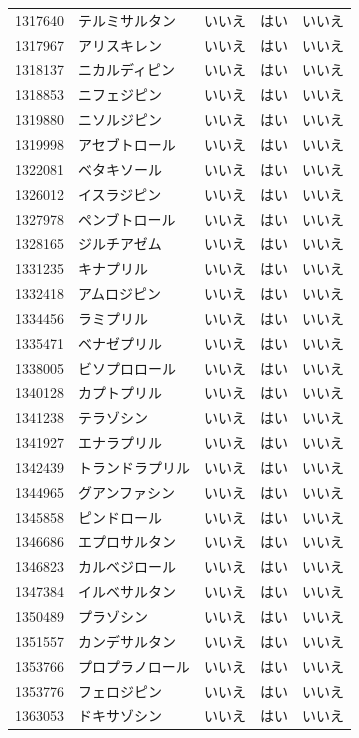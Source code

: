 \documentclass[
  11pt]{book}
\theoremstyle{definition}
\theoremstyle{definition}
\theoremstyle{definition}
\theoremstyle{definition}
\theoremstyle{remark}
\begin{document}
\begin{longtable}[]{@{}lllll@{}}
1317640 & テルミサルタン & いいえ & はい & いいえ \\
1317967 & アリスキレン & いいえ & はい & いいえ \\
1318137 & ニカルディピン & いいえ & はい & いいえ \\
1318853 & ニフェジピン & いいえ & はい & いいえ \\
1319880 & ニソルジピン & いいえ & はい & いいえ \\
1319998 & アセブトロール & いいえ & はい & いいえ \\
1322081 & ベタキソール & いいえ & はい & いいえ \\
1326012 & イスラジピン & いいえ & はい & いいえ \\
1327978 & ペンブトロール & いいえ & はい & いいえ \\
1328165 & ジルチアゼム & いいえ & はい & いいえ \\
1331235 & キナプリル & いいえ & はい & いいえ \\
1332418 & アムロジピン & いいえ & はい & いいえ \\
1334456 & ラミプリル & いいえ & はい & いいえ \\
1335471 & ベナゼプリル & いいえ & はい & いいえ \\
1338005 & ビソプロロール & いいえ & はい & いいえ \\
1340128 & カプトプリル & いいえ & はい & いいえ \\
1341238 & テラゾシン & いいえ & はい & いいえ \\
1341927 & エナラプリル & いいえ & はい & いいえ \\
1342439 & トランドラプリル & いいえ & はい & いいえ \\
1344965 & グアンファシン & いいえ & はい & いいえ \\
1345858 & ピンドロール & いいえ & はい & いいえ \\
1346686 & エプロサルタン & いいえ & はい & いいえ \\
1346823 & カルベジロール & いいえ & はい & いいえ \\
1347384 & イルベサルタン & いいえ & はい & いいえ \\
1350489 & プラゾシン & いいえ & はい & いいえ \\
1351557 & カンデサルタン & いいえ & はい & いいえ \\
1353766 & プロプラノロール & いいえ & はい & いいえ \\
1353776 & フェロジピン & いいえ & はい & いいえ \\
1363053 & ドキサゾシン & いいえ & はい & いいえ \\

\end{longtable}
\end{document}
